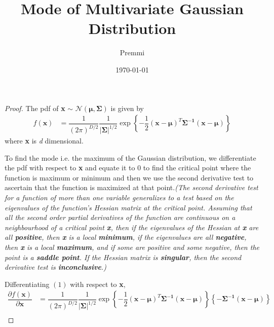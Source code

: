 \documentclass[14pt]{extarticle}
\title{Mode of Multivariate Gaussian Distribution}
\author{Premmi}
\date{\today}
\begin{document}
    
\maketitle
\begin{flushleft}	
\begin{large}
\begin{proof} 
The pdf of \textbf{x} $\sim$ $\mathcal{N} \left(\boldsymbol{\mu},\boldsymbol{\Sigma}\right)$ is given by
\begin{align}
f(\mathbf{x}) &= \dfrac{1}{\left(2\pi\right)^{D/2}} \dfrac{1}{\vert\boldsymbol{\Sigma}\vert^{1/2}} \exp \left\lbrace -\dfrac{1}{2}\left(\mathbf{x} - \boldsymbol{\mu}\right)^T \boldsymbol{\Sigma^{-1}} \left(\mathbf{x} - \boldsymbol{\mu}\right) \right\rbrace
\end{align}
where \textbf{x} is \textit{d} dimensional. \\
\hfill \break
\begin{minipage}{35em}
To find the mode i.e. the maximum of the Gaussian distribution, we differentiate the pdf with respect to \textbf{x} and equate it to $0$ to find the critical point where the function is maximum or minimum and then we use the second derivative test to ascertain that the function is maximized at that point.\textit{(The second derivative test for a function of more than one variable generalizes to a test based on the eigenvalues of the function's Hessian matrix at the critical point. Assuming that all the second order partial derivatives of the function are continuous on a neighbourhood of a critical point \textbf{x},  then if the eigenvalues of the Hessian at \textbf{x} are all \textbf{positive}, then \textbf{x} is a local \textbf{minimum}, if the eigenvalues are all \textbf{negative}, then \textbf{x} is a local \textbf{maximum}, and if some are positive and some negative, then the point is a \textbf{saddle point}. If the Hessian matrix is \textbf{singular}, then the second derivative test is \textbf{inconclusive}.)}
\end{minipage}
\hfill \break
\hfill \break
Differentiating $(1)$ with respect to \textbf{x},
\begin{align}
\dfrac{\partial f(\mathbf{x})}{\partial \mathbf{x}} &= \dfrac{1}{\left(2\pi\right)^{D/2}} \dfrac{1}{\vert\boldsymbol{\Sigma}\vert^{1/2}} \exp \left\lbrace -\dfrac{1}{2}\left(\mathbf{x} - \boldsymbol{\mu}\right)^T \boldsymbol{\Sigma^{-1}} \left(\mathbf{x} - \boldsymbol{\mu}\right) \right\rbrace \left\lbrace-\mathbf{\Sigma^{-1}\left(x-\boldsymbol{\mu}\right)}\right\rbrace \\

\end{align}
\end{proof}
\end{large}
\end{flushleft}
\end{document}
